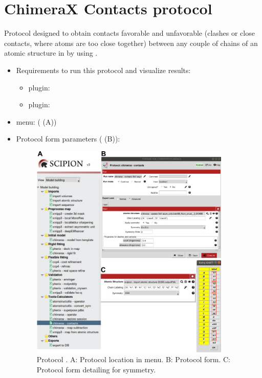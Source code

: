 \section{ChimeraX Contacts protocol}
\label{app:chimeraContactsProtocol}%

Protocol designed to obtain contacts favorable and unfavorable (clashes or close contacts, where atoms are too close together) between any couple of chains of an atomic structure in \scipion by using \chimera. 

 \begin{itemize}
  \item Requirements to run this protocol and visualize results:
    \begin{itemize}
        \item \scipion plugin: 
        \item \scipion plugin: 
    \end{itemize}
  \item \scipion menu:
    ( (A))
  
  \item Protocol form parameters ( (B)):
  
  \begin{figure}[H]
     \centering 
     \captionsetup{width=.9\linewidth} 
     \includegraphics[width=0.90\textwidth]{Images_appendix/Fig155.pdf}
     \caption{Protocol . A: Protocol location in \scipion menu. B: Protocol form. C: Protocol form detailing  for  symmetry.}
     \label{fig:app_protocol_contacts_1}
    \end{figure}


\end{itemize}
